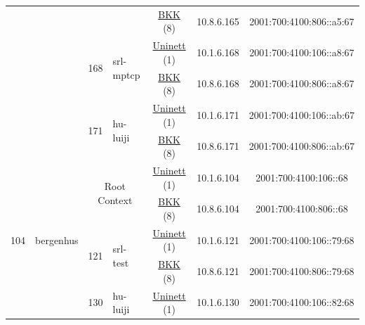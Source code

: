 \begin{small}
\begin{center}
\begin{longtable}{|c|c|c|c|c|c|c|c|}
  &  &  &  & \multicolumn{2}{|c|}{\tiny{\href{http://bkk.no}{BKK} (8)}} & \tiny{10.8.6.165} & \tiny{2001:700:4100:806::a5:67} \\* \cline{3-3}\cline{4-4}\cline{5-5}\cline{6-6}\cline{7-7}\cline{8-8}
  &  & \multirow{2}{*}{\tiny{168}} & \multicolumn{1}{|l|}{\multirow{2}{*}{\tiny{srl-mptcp}}} & \multicolumn{2}{|c|}{\tiny{\href{https://www.uninett.no}{Uninett} (1)}} & \tiny{10.1.6.168} & \tiny{2001:700:4100:106::a8:67} \\* \cline{5-5}\cline{6-6}\cline{7-7}\cline{8-8}
  &  &  &  & \multicolumn{2}{|c|}{\tiny{\href{http://bkk.no}{BKK} (8)}} & \tiny{10.8.6.168} & \tiny{2001:700:4100:806::a8:67} \\* \cline{3-3}\cline{4-4}\cline{5-5}\cline{6-6}\cline{7-7}\cline{8-8}
  &  & \multirow{2}{*}{\tiny{171}} & \multicolumn{1}{|l|}{\multirow{2}{*}{\tiny{hu-luiji}}} & \multicolumn{2}{|c|}{\tiny{\href{https://www.uninett.no}{Uninett} (1)}} & \tiny{10.1.6.171} & \tiny{2001:700:4100:106::ab:67} \\* \cline{5-5}\cline{6-6}\cline{7-7}\cline{8-8}
  &  &  &  & \multicolumn{2}{|c|}{\tiny{\href{http://bkk.no}{BKK} (8)}} & \tiny{10.8.6.171} & \tiny{2001:700:4100:806::ab:67} \\ \hline
 \multirow{20}{*}{\tiny{104}} & \multicolumn{1}{|l|}{\multirow{20}{*}{\tiny{bergenhus}}} & \multicolumn{2}{|c|}{\multirow{2}{*}{\tiny{Root Context}}} & \multicolumn{2}{|c|}{\tiny{\href{https://www.uninett.no}{Uninett} (1)}} & \tiny{10.1.6.104} & \tiny{2001:700:4100:106::68} \\* \cline{5-5}\cline{6-6}\cline{7-7}\cline{8-8}
  &  & \multicolumn{2}{|c|}{} & \multicolumn{2}{|c|}{\tiny{\href{http://bkk.no}{BKK} (8)}} & \tiny{10.8.6.104} & \tiny{2001:700:4100:806::68} \\* \cline{3-3}\cline{4-4}\cline{5-5}\cline{6-6}\cline{7-7}\cline{8-8}
  &  & \multirow{2}{*}{\tiny{121}} & \multicolumn{1}{|l|}{\multirow{2}{*}{\tiny{srl-test}}} & \multicolumn{2}{|c|}{\tiny{\href{https://www.uninett.no}{Uninett} (1)}} & \tiny{10.1.6.121} & \tiny{2001:700:4100:106::79:68} \\* \cline{5-5}\cline{6-6}\cline{7-7}\cline{8-8}
  &  &  &  & \multicolumn{2}{|c|}{\tiny{\href{http://bkk.no}{BKK} (8)}} & \tiny{10.8.6.121} & \tiny{2001:700:4100:806::79:68} \\* \cline{3-3}\cline{4-4}\cline{5-5}\cline{6-6}\cline{7-7}\cline{8-8}
  &  & \multirow{2}{*}{\tiny{130}} & \multicolumn{1}{|l|}{\multirow{2}{*}{\tiny{hu-luiji}}} & \multicolumn{2}{|c|}{\tiny{\href{https://www.uninett.no}{Uninett} (1)}} & \tiny{10.1.6.130} & \tiny{2001:700:4100:106::82:68} \\* \cline{5-5}\cline{6-6}\cline{7-7}\cline{8-8}

\end{longtable}
\end{center}
\end{small}
